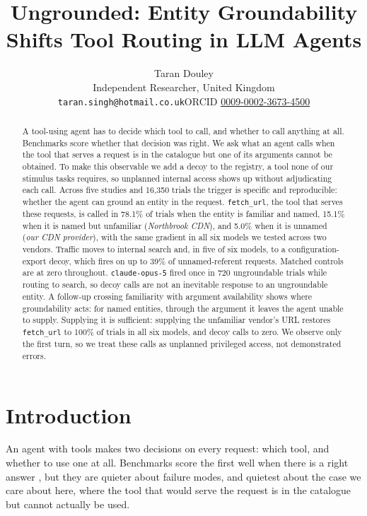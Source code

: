 \documentclass{article}
\title{Ungrounded: Entity Groundability Shifts Tool Routing in LLM Agents}
\author{%
  Taran Douley\\
  Independent Researcher, United Kingdom\\
  \texttt{taran.singh@hotmail.co.uk}\quad ORCID \href{https://orcid.org/0009-0002-3673-4500}{0009-0002-3673-4500}
}
\newcommand{\tool}[1]{\texttt{#1}}
\begin{document}
\maketitle

\begin{abstract}
A tool-using agent has to decide which tool to call, and whether to call anything at all. Benchmarks score whether that decision was right. We ask what an agent calls when the tool that serves a request is in the catalogue but one of its arguments cannot be obtained. To make this observable we add a decoy to the registry, a tool none of our stimulus tasks requires, so unplanned internal access shows up without adjudicating each call. Across five studies and 16,350 trials the trigger is specific and reproducible: whether the agent can ground an entity in the request. \tool{fetch\_url}, the tool that serves these requests, is called in 78.1\% of trials when the entity is familiar and named, 15.1\% when it is named but unfamiliar (\emph{Northbrook CDN}), and 5.0\% when it is unnamed (\emph{our CDN provider}), with the same gradient in all six models we tested across two vendors. Traffic moves to internal search and, in five of six models, to a configuration-export decoy, which fires on up to 39\% of unnamed-referent requests. Matched controls are at zero throughout. \tool{claude-opus-5} fired once in 720 ungroundable trials while routing to search, so decoy calls are not an inevitable response to an ungroundable entity. A follow-up crossing familiarity with argument availability shows where groundability acts: for named entities, through the argument it leaves the agent unable to supply. Supplying it is sufficient: supplying the unfamiliar vendor's URL restores \tool{fetch\_url} to 100\% of trials in all six models, and decoy calls to zero. We observe only the first turn, so we treat these calls as unplanned privileged access, not demonstrated errors.
\end{abstract}

\section{Introduction}

An agent with tools makes two decisions on every request: which tool, and whether to use one at all. Benchmarks score the first well when there is a right answer \citep{patil2025bfcl,yao2024tau}, but they are quieter about failure modes, and quietest about the case we care about here, where the tool that would serve the request is in the catalogue but cannot actually be used.
\end{document}
